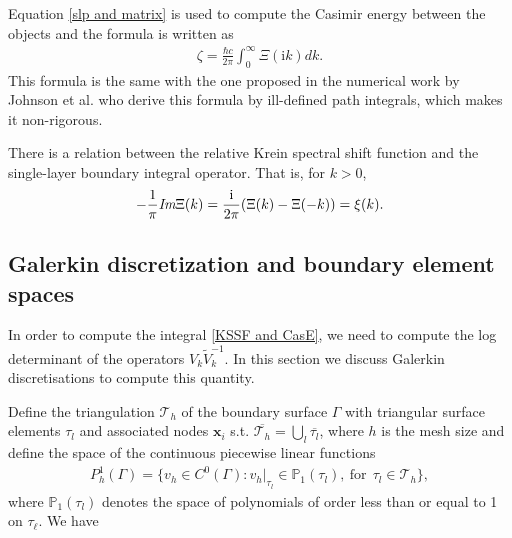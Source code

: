 Equation \eqref{slp and matrix} is used to compute the Casimir energy between the objects and the formula is written as
\begin{align}\label{KSSF and CasE}
    \zeta = \frac{\hbar c}{2\pi}\int_{0}^{\infty}\Xi(\mathrm{i}k)dk.
\end{align}
This formula is the same with the one proposed in the numerical work by Johnson et al. who derive this formula by ill-defined path integrals\cite{reid2009efficient},
which makes it non-rigorous.

\begin{remark}
    There is a relation between the relative Krein spectral shift function and the single-layer boundary integral operator. That is,
    for $k > 0$, 
    \begin{align*}
        -\frac{1}{\pi}\emph{\text{Im}}\Xi(k) = \frac{\mathrm{i}}{2\pi}(\Xi(k) - \Xi(-k)) = \xi(k).
    \end{align*}
\end{remark}



\subsection{Galerkin discretization and boundary element spaces}
In order to compute the integral \eqref{KSSF and CasE}, we need to compute the log determinant of the operators $V_{k}\tilde{V}_{k}^{-1}$. In this section we discuss Galerkin discretisations to compute this quantity.

Define the 
triangulation $\mathcal{T}_{h}$ of the boundary surface $\Gamma$ with triangular surface elements $\tau_{l}$ and associated nodes $\boldsymbol{x}_{i}$ 
s.t. $\overline{\mathcal{T}_{h}} = \bigcup_{l}\overline{\tau_{l}}$, where $h$ is the mesh size and define the space of the continuous piecewise linear functions
\begin{align*}
    P_{h}^{1}(\Gamma) = \{v_{h}\in C^{0}(\Gamma): v_{h}|_{\tau_{l}}\in\mathbb{P}_{1}(\tau_{l}), \ \text{for} \ \ \tau_{l}\in\mathcal{T}_{h}\},
\end{align*}
where $\mathbb{P}_{1}(\tau_{l})$ denotes the space of polynomials of order less than or equal to 1 on $\tau_{\ell}$. We have

